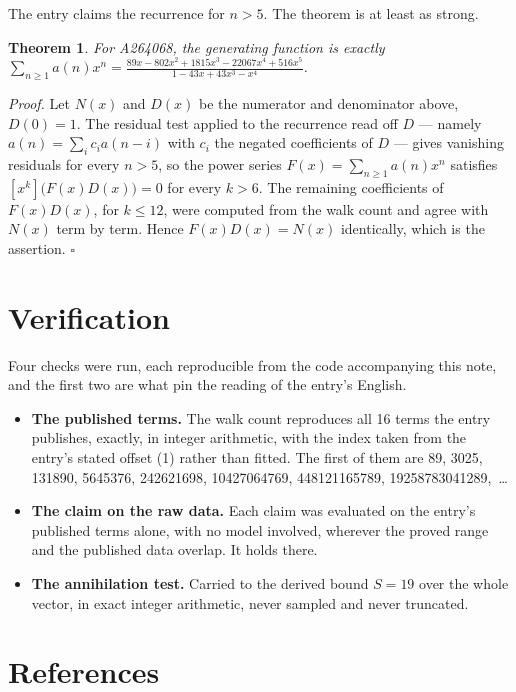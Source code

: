 \documentclass[11pt]{article}
\newtheorem{theorem}{Theorem}
\theoremstyle{definition}
\begin{document}
The entry claims the recurrence for $n > 5$. The theorem is at least as strong.

\begin{theorem} For A264068, the generating function is exactly $\sum_{n\ge 1} a(n)x^n = \frac{89x - 802x^{2} + 1815x^{3} - 22067x^{4} + 516x^{5}}{1 - 43x + 43x^{3} - x^{4}}$.\end{theorem}

{\itshape Proof.} Let $N(x)$ and $D(x)$ be the numerator and denominator above, $D(0)=1$. The residual test applied to the recurrence read off $D$ --- namely $a(n) = \sum_i c_i a(n-i)$ with $c_i$ the negated coefficients of $D$ --- gives vanishing residuals for every $n > 5$, so the power series $F(x)=\sum_{n\ge 1}a(n)x^n$ satisfies $[x^k]\bigl(F(x)D(x)\bigr) = 0$ for every $k > 6$. The remaining coefficients of $F(x)D(x)$, for $k \le 12$, were computed from the walk count and agree with $N(x)$ term by term. Hence $F(x)D(x) = N(x)$ identically, which is the assertion. $\square$

\section{Verification}

Four checks were run, each reproducible from the code accompanying this note, and the first two are what pin the reading of the entry's English.

\begin{itemize}

\item {\bfseries The published terms.} The walk count reproduces all 16 terms the entry publishes, exactly, in integer arithmetic, with the index taken from the entry's stated offset (1) rather than fitted. The first of them are 89, 3025, 131890, 5645376, 242621698, 10427064769, 448121165789, 19258783041289,~\dots

\item {\bfseries The claim on the raw data.} Each claim was evaluated on the entry's published terms alone, with no model involved, wherever the proved range and the published data overlap. It holds there.

\item {\bfseries The annihilation test.} Carried to the derived bound $S = 19$ over the whole vector, in exact integer arithmetic, never sampled and never truncated.

\end{itemize}

\section{References}
\end{document}
